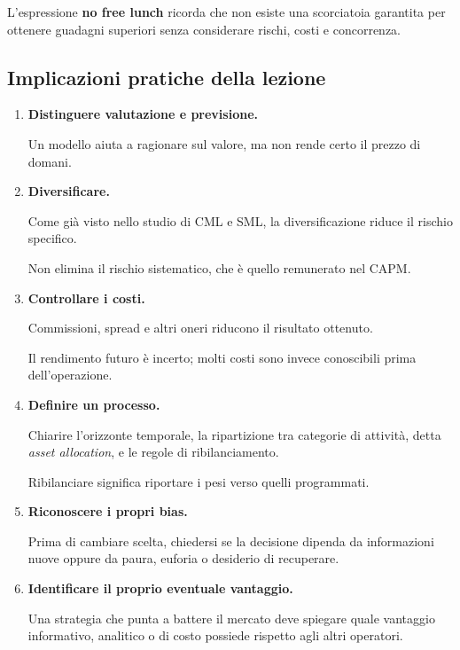 \noindent L'espressione \textbf{no free lunch}
ricorda che non esiste una scorciatoia garantita
per ottenere guadagni superiori
senza considerare rischi, costi e concorrenza.


\subsection{Implicazioni pratiche della lezione}

\begin{enumerate}
    \item \textbf{Distinguere valutazione
    e previsione.}

    Un modello aiuta a ragionare sul valore,
    ma non rende certo il prezzo di domani.

    \item \textbf{Diversificare.}

    Come già visto nello studio di CML e SML,
    la diversificazione riduce
    il rischio specifico.

    Non elimina il rischio sistematico,
    che è quello remunerato nel CAPM.

    \item \textbf{Controllare i costi.}

    Commissioni, spread e altri oneri
    riducono il risultato ottenuto.

    Il rendimento futuro è incerto;
    molti costi sono invece conoscibili
    prima dell'operazione.

    \item \textbf{Definire un processo.}

    Chiarire l'orizzonte temporale,
    la ripartizione tra categorie di attività,
    detta \textit{asset allocation},
    e le regole di ribilanciamento.

    Ribilanciare significa riportare i pesi
    verso quelli programmati.

    \item \textbf{Riconoscere i propri bias.}

    Prima di cambiare scelta,
    chiedersi se la decisione dipenda
    da informazioni nuove oppure da paura,
    euforia o desiderio di recuperare.

    \item \textbf{Identificare il proprio
    eventuale vantaggio.}

    Una strategia che punta a battere il mercato
    deve spiegare quale vantaggio informativo,
    analitico o di costo possiede
    rispetto agli altri operatori.
\end{enumerate}

